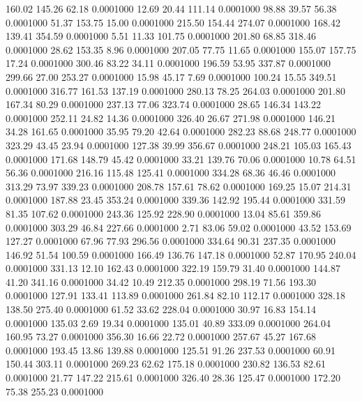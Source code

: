  160.02  145.26   62.18   0.0001000
  12.69   20.44  111.14   0.0001000
  98.88   39.57   56.38   0.0001000
  51.37  153.75   15.00   0.0001000
 215.50  154.44  274.07   0.0001000
 168.42  139.41  354.59   0.0001000
   5.51   11.33  101.75   0.0001000
 201.80   68.85  318.46   0.0001000
  28.62  153.35    8.96   0.0001000
 207.05   77.75   11.65   0.0001000
 155.07  157.75   17.24   0.0001000
 300.46   83.22   34.11   0.0001000
 196.59   53.95  337.87   0.0001000
 299.66   27.00  253.27   0.0001000
  15.98   45.17    7.69   0.0001000
 100.24   15.55  349.51   0.0001000
 316.77  161.53  137.19   0.0001000
 280.13   78.25  264.03   0.0001000
 201.80  167.34   80.29   0.0001000
 237.13   77.06  323.74   0.0001000
  28.65  146.34  143.22   0.0001000
 252.11   24.82   14.36   0.0001000
 326.40   26.67  271.98   0.0001000
 146.21   34.28  161.65   0.0001000
  35.95   79.20   42.64   0.0001000
 282.23   88.68  248.77   0.0001000
 323.29   43.45   23.94   0.0001000
 127.38   39.99  356.67   0.0001000
 248.21  105.03  165.43   0.0001000
 171.68  148.79   45.42   0.0001000
  33.21  139.76   70.06   0.0001000
  10.78   64.51   56.36   0.0001000
 216.16  115.48  125.41   0.0001000
 334.28   68.36   46.46   0.0001000
 313.29   73.97  339.23   0.0001000
 208.78  157.61   78.62   0.0001000
 169.25   15.07  214.31   0.0001000
 187.88   23.45  353.24   0.0001000
 339.36  142.92  195.44   0.0001000
 331.59   81.35  107.62   0.0001000
 243.36  125.92  228.90   0.0001000
  13.04   85.61  359.86   0.0001000
 303.29   46.84  227.66   0.0001000
   2.71   83.06   59.02   0.0001000
  43.52  153.69  127.27   0.0001000
  67.96   77.93  296.56   0.0001000
 334.64   90.31  237.35   0.0001000
 146.92   51.54  100.59   0.0001000
 166.49  136.76  147.18   0.0001000
  52.87  170.95  240.04   0.0001000
 331.13   12.10  162.43   0.0001000
 322.19  159.79   31.40   0.0001000
 144.87   41.20  341.16   0.0001000
  34.42   10.49  212.35   0.0001000
 298.19   71.56  193.30   0.0001000
 127.91  133.41  113.89   0.0001000
 261.84   82.10  112.17   0.0001000
 328.18  138.50  275.40   0.0001000
  61.52   33.62  228.04   0.0001000
  30.97   16.83  154.14   0.0001000
 135.03    2.69   19.34   0.0001000
 135.01   40.89  333.09   0.0001000
 264.04  160.95   73.27   0.0001000
 356.30   16.66   22.72   0.0001000
 257.67   45.27  167.68   0.0001000
 193.45   13.86  139.88   0.0001000
 125.51   91.26  237.53   0.0001000
  60.91  150.44  303.11   0.0001000
 269.23   62.62  175.18   0.0001000
 230.82  136.53   82.61   0.0001000
  21.77  147.22  215.61   0.0001000
 326.40   28.36  125.47   0.0001000
 172.20   75.38  255.23   0.0001000
